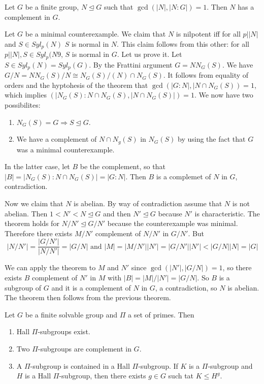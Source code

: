 \documentclass[twoside, 11pt]{article}
\begin{document}
\begin{teorema}[Zassenhaus]
Let $G$ be a finite group, $N\trianglelefteq G$ such that $\gcd(|N|,|N:G|)=1$. Then $N$ has a complement in $G$.
\end{teorema}
\begin{dem}
Let $G$ be a minimal counterexample. We claim that $N$ is nilpotent iff for all $p||N|$ and $S\in Syl_p(N)$ $S$ is normal in $N$. This claim follows from this other: for all $p||N|, S\in Syl_p(N9$, $S$ is normal in $G$. Let us prove it. Let $S\in Syl_p(N)=Syl_p(G)$. By the Frattini argument $G=NN_G(S)$. We have $G/N=NN_G(S)/N\cong N_G(S)/(N)\cap N_G(S)$. It follows from equality of orders and the hyptohesis of the theorem that $\gcd(|G:N|,|N\cap N_G(S))=1$, which implies $(|N_G(S):N\cap N_G(S), |N\cap N_G(S)|)=1$. We now have two possibilites:
\begin{enumerate}
\item $N_G(S)=G\Rightarrow S\trianglelefteq G$.
\item We have a complement of $N\cap N_g(S)$ in $N_G(S)$ by using the fact that $G$ was a minimal counterexample.
\end{enumerate}
In the latter case, let $B$ be the complement, so that $|B|=|N_G(S):N\cap N_G(S)|=|G:N|$. Then $B$ is a complemet of $N$ in $G$, contradiction.

Now we claim that $N$ is abelian. By way of contradiction assume that $N$ is not abelian. Then $1<N'<N\trianglelefteq G$ and then $N'\trianglelefteq G$ because $N'$ is characteristic. The theorem holds for $N/N'\trianglelefteq G/N'$ because the counterexample was minimal. Therefore there exists $M/N'$ complement of $N/N'$ in $G/N'$. But 
\[
|N/N'|=\frac{|G/N'|}{|N/N'|}=|G/N|\text{ and } |M|=|M/N'||N'|=|G/N'||N'|<|G/N||N|=|G|
\]

We can apply the theorem to $M$ and $N'$ since $\gcd(|N'|,|G/N|)=1$, so there exists $B$ complement of $N'$ in $M$ with $|B|=|M|/|N'|=|G/N|$. So $B$ is a subgroup of $G$ and it is a complement of $N$ in $G$, a contradiction, so $N$ is abelian. The theorem then follows from the previous theorem.  

\end{dem}

\begin{teorema}[Hall]
Let $G$ be a finite solvable group and $\Pi$ a set of primes. Then
\begin{enumerate}
\item Hall $\Pi$-subgroups exist.
\item Two $\Pi$-subgroups are complement in $G$.
\item A $\Pi$-subgroup is contained in a Hall $\Pi$-subgroup. If $K$ is a $\Pi$-subgroup and $H$ is a Hall $\Pi$-subgroup, then there exists $g\in G$ such tat $K\leq H^g$. 
\end{enumerate}
\end{teorema}
\end{document}
